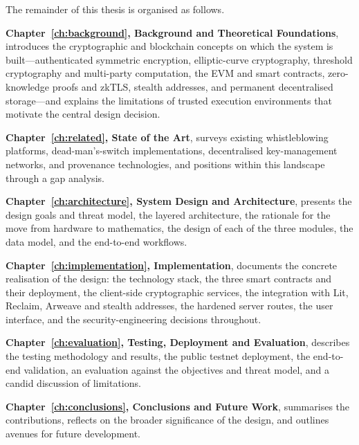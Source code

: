 The remainder of this thesis is organised as follows.

\textbf{Chapter~\ref{ch:background}, Background and Theoretical Foundations},
introduces the cryptographic and blockchain concepts on which the system is
built---authenticated symmetric encryption, elliptic-curve cryptography,
threshold cryptography and multi-party computation, the EVM and smart contracts,
zero-knowledge proofs and zkTLS, stealth addresses, and permanent decentralised
storage---and explains the limitations of trusted execution environments that
motivate the central design decision.

\textbf{Chapter~\ref{ch:related}, State of the Art}, surveys existing
whistleblowing platforms, dead-man's-switch implementations, decentralised
key-management networks, and provenance technologies, and positions \zkw within
this landscape through a gap analysis.

\textbf{Chapter~\ref{ch:architecture}, System Design and Architecture}, presents
the design goals and threat model, the layered architecture, the rationale for
the move from hardware to mathematics, the design of each of the three modules,
the data model, and the end-to-end workflows.

\textbf{Chapter~\ref{ch:implementation}, Implementation}, documents the concrete
realisation of the design: the technology stack, the three smart contracts and
their deployment, the client-side cryptographic services, the integration with
Lit, Reclaim, Arweave and stealth addresses, the hardened server routes, the
user interface, and the security-engineering decisions throughout.

\textbf{Chapter~\ref{ch:evaluation}, Testing, Deployment and Evaluation},
describes the testing methodology and results, the public testnet deployment, the
end-to-end validation, an evaluation against the objectives and threat model, and
a candid discussion of limitations.

\textbf{Chapter~\ref{ch:conclusions}, Conclusions and Future Work}, summarises
the contributions, reflects on the broader significance of the design, and
outlines avenues for future development.
